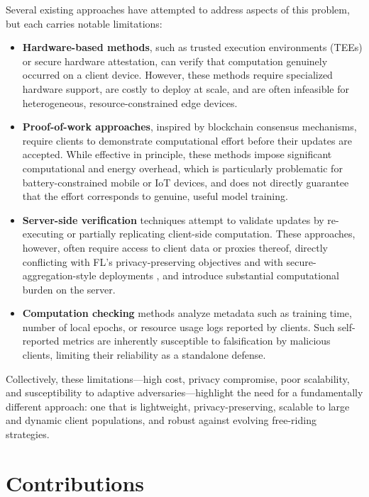 Several existing approaches have attempted to address aspects of this problem, but each carries notable limitations:

\begin{itemize}
    \item \textbf{Hardware-based methods}, such as trusted execution environments (TEEs) or secure hardware attestation, can verify that computation genuinely occurred on a client device. However, these methods require specialized hardware support, are costly to deploy at scale, and are often infeasible for heterogeneous, resource-constrained edge devices.

    \item \textbf{Proof-of-work approaches}, inspired by blockchain consensus mechanisms, require clients to demonstrate computational effort before their updates are accepted. While effective in principle, these methods impose significant computational and energy overhead, which is particularly problematic for battery-constrained mobile or IoT devices, and does not directly guarantee that the effort corresponds to genuine, useful model training.

    \item \textbf{Server-side verification} techniques attempt to validate updates by re-executing or partially replicating client-side computation. These approaches, however, often require access to client data or proxies thereof, directly conflicting with FL's privacy-preserving objectives and with secure-aggregation-style deployments \cite{bonawitz2017practical}, and introduce substantial computational burden on the server.

    \item \textbf{Computation checking} methods analyze metadata such as training time, number of local epochs, or resource usage logs reported by clients. Such self-reported metrics are inherently susceptible to falsification by malicious clients, limiting their reliability as a standalone defense.

\end{itemize}

Collectively, these limitations—high cost, privacy compromise, poor scalability, and susceptibility to adaptive adversaries—highlight the need for a fundamentally different approach: one that is lightweight, privacy-preserving, scalable to large and dynamic client populations, and robust against evolving free-riding strategies.


\section{Contributions}
\label{sec:contributions}

